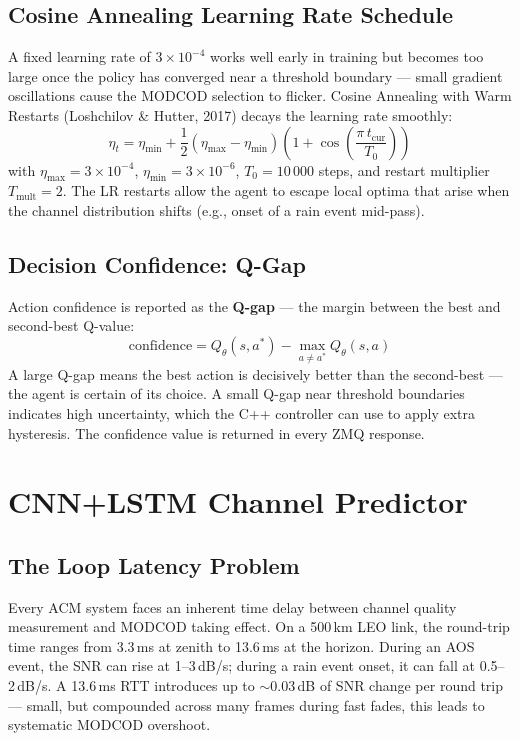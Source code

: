 \documentclass[12pt,a4paper]{report}
\begin{document}
\subsection{Cosine Annealing Learning Rate Schedule}

A fixed learning rate of $3\times10^{-4}$ works well early in training but
becomes too large once the policy has converged near a threshold boundary ---
small gradient oscillations cause the MODCOD selection to flicker. Cosine
Annealing with Warm Restarts (Loshchilov \& Hutter, 2017) decays the learning
rate smoothly:
\begin{equation}
    \eta_t = \eta_\text{min} + \frac{1}{2}(\eta_\text{max} - \eta_\text{min})
    \left(1 + \cos\!\left(\frac{\pi\, t_\text{cur}}{T_0}\right)\right)
\end{equation}
with $\eta_\text{max} = 3\times10^{-4}$, $\eta_\text{min} = 3\times10^{-6}$,
$T_0 = 10\,000$ steps, and restart multiplier $T_\text{mult} = 2$.
The LR restarts allow the agent to escape local optima that arise when the
channel distribution shifts (e.g., onset of a rain event mid-pass).

\subsection{Decision Confidence: Q-Gap}

Action confidence is reported as the \textbf{Q-gap} --- the margin between
the best and second-best Q-value:
\begin{equation}
    \text{confidence} = Q_\theta(s, a^*) - \max_{a \neq a^*} Q_\theta(s, a)
\end{equation}
A large Q-gap means the best action is decisively better than the second-best
--- the agent is certain of its choice. A small Q-gap near threshold boundaries
indicates high uncertainty, which the C++ controller can use to apply extra
hysteresis. The confidence value is returned in every ZMQ response.

\section{CNN+LSTM Channel Predictor}

\subsection{The Loop Latency Problem}

Every ACM system faces an inherent time delay between channel quality
measurement and MODCOD taking effect. On a 500\,km LEO link, the round-trip
time ranges from 3.3\,ms at zenith to 13.6\,ms at the horizon. During an
AOS event, the SNR can rise at 1--3\,dB/s; during a rain event onset, it
can fall at 0.5--2\,dB/s. A 13.6\,ms RTT introduces up to $\sim$0.03\,dB
of SNR change per round trip --- small, but compounded across many frames
during fast fades, this leads to systematic MODCOD overshoot.
\end{document}
